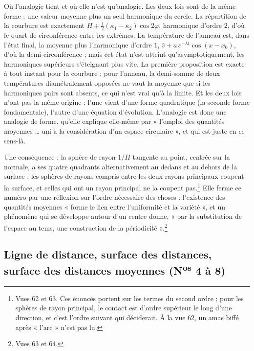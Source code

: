 \documentclass[11pt,a4paper]{article}
\begin{document}
Où l'analogie tient et où elle n'est qu'analogie. Les deux lois sont de la même
forme : une valeur moyenne plus un seul harmonique du cercle. La répartition
de la courbure est exactement $H + \frac12(\kappa_1-\kappa_2)\cos 2\varphi$,
harmonique d'ordre $2$, d'où le quart de circonférence entre les extrêmes. La
température de l'anneau est, dans l'état final, la moyenne plus l'harmonique
d'ordre $1$, $\bar v + a\,e^{-\lambda t}\cos(x - x_0)$, d'où la demi-circonférence ;
mais cet état n'est atteint qu'asymptotiquement, les harmoniques supérieurs
s'éteignant plus vite. La première proposition est exacte à tout instant pour la
courbure ; pour l'anneau, la demi-somme de deux températures diamétralement
opposées ne vaut la moyenne que si les harmoniques pairs sont absents, ce qui
n'est vrai qu'à la limite. Et les deux lois n'ont pas la même origine : l'une
vient d'une forme quadratique (la seconde forme fondamentale), l'autre d'une
équation d'évolution. L'analogie est donc une analogie de forme, qu'elle
explique elle-même par « l'emploi des quantités moyennes … uni à la
considération d'un espace circulaire », et qui est juste en ce sens-là.

Une conséquence : la sphère de rayon $1/H$ tangente au point, centrée sur la
normale, a ses quatre quadrants alternativement au dedans et au dehors de la
surface ; les sphères de rayons compris entre les deux rayons principaux coupent
la surface, et celles qui ont un rayon principal ne la coupent pas.\footnote{Vues
62 et 63. Ces énoncés portent sur les termes du second ordre ; pour les sphères
de rayon principal, le contact est d'ordre supérieur le long d'une direction, et
c'est l'ordre suivant qui déciderait. À la vue 62, un amas biffé après « l'arc »
n'est pas lu.} Elle ferme ce numéro par une réflexion
sur l'ordre nécessaire des choses : l'existence des quantités moyennes « forme le lien
entre l'uniformité et la variété », et un phénomène qui se développe autour
d'un centre donne, « par la substitution de l'espace au tems, une construction
de la périodicité ».\footnote{Vues 63 et 64.}

\subsection*{Ligne de distance, surface des distances, surface des distances moyennes (N\textsuperscript{os} 4 à 8)}
\end{document}
